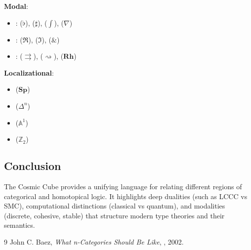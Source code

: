 \documentclass{article}
\begin{document}
\noindent \textbf{Modal}:
\begin{itemize}
\item {}:  ($\flat$),  ($\sharp$),  ($\int$),  ($\nabla$)
\item {}:  ($\Re$),  ($\Im$),  ($\&$)
\item {}:  ($\rightrightarrows$),  ($\rightsquigarrow$),  ($\mathbf{Rh}$)
\end{itemize}

\noindent \textbf{Localizational}:
\begin{itemize}
\item {} ($\mathbf{Sp}$)
\item {} ($\mathbb{\Delta}^n$)
\item {} ($\mathbb{A}^1$)
\item {} ($\mathbb{Z}_2$)
\end{itemize}

\subsection{Conclusion}
The Cosmic Cube provides a unifying language for relating different regions
of categorical and homotopical logic. It highlights deep dualities (such as
LCCC vs SMC), computational distinctions (classical vs quantum),
and modalities (discrete, cohesive, stable) that structure modern
type theories and their semantics.

\begin{thebibliography}{9}
 John C. Baez, \emph{What n-Categories Should Be Like}, , 2002.
\end{thebibliography}
\end{document}
